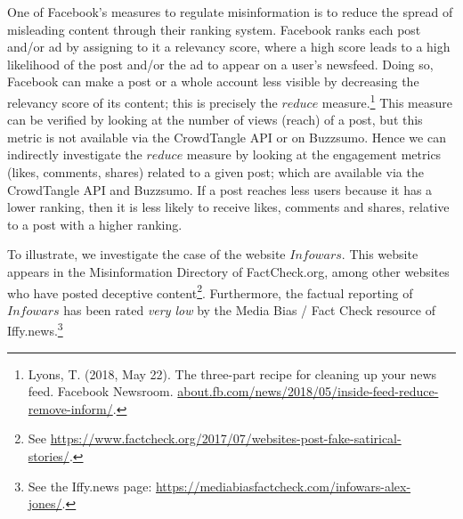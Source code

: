 \documentclass{article}
\begin{document}
One of Facebook’s measures to regulate misinformation is to reduce the spread of misleading content through their ranking system. Facebook ranks each post and/or ad by assigning to it a relevancy score, where a high score leads to a high likelihood of the post and/or the ad to appear on a user's newsfeed. Doing so, Facebook can make a post or a whole account less visible by decreasing the relevancy score of its content; this is precisely the $reduce$ measure.\footnote{Lyons, T. (2018, May 22). The three-part recipe for cleaning up your news feed. Facebook Newsroom. \href{https://about.fb.com/news/2018/05/inside-feed-reduce-remove-inform/}{about.fb.com/news/2018/05/inside-feed-reduce-remove-inform/}.} This measure can be verified by looking at the number of views (reach) of a post, but this metric is not available via the CrowdTangle API or on Buzzsumo. Hence we can indirectly investigate the $reduce$ measure by looking at the engagement metrics (likes, comments, shares) related to a given post; which are available via the CrowdTangle API and Buzzsumo. If a post reaches less users because it has a lower ranking, then it is less likely to receive likes, comments and shares, relative to a post with a higher ranking. 


\smallskip

To illustrate, we investigate the case of the website $Infowars$. This website appears in the Misinformation Directory of FactCheck.org, among other websites who have posted deceptive content\footnote{See \href{https://www.factcheck.org/2017/07/websites-post-fake-satirical-stories/}{https://www.factcheck.org/2017/07/websites-post-fake-satirical-stories/}.}. Furthermore, the factual reporting of $Infowars$ has been rated {\it very low} by the Media Bias / Fact Check resource of Iffy.news.\footnote{See the Iffy.news page: \href{https://mediabiasfactcheck.com/infowars-alex-jones/}{https://mediabiasfactcheck.com/infowars-alex-jones/}.} 
\end{document}
